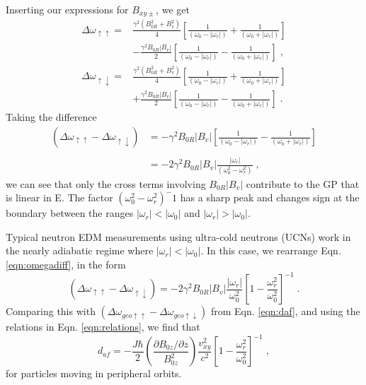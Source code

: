 %
Inserting our expressions for $B_{xy\pm}$, we get
%
\begin{equation}
\begin{split}
\Delta \omega_{\uparrow\uparrow} = & \frac{\gamma^2 (B_{0R}^2 + B_{v}^2)}{4} \left[ 
\frac{1}{(\omega_0 - |\omega_r|)} + \frac{1}{(\omega_0 + |\omega_r|)} \right] \\ & - \frac{\gamma^2 B_{0R} |B_v|}{2} \left[ 
\frac{1}{(\omega_0 - |\omega_r|)} - \frac{1}{(\omega_0 + |\omega_r|)} \right] \; ,
\end{split}
\end{equation}
%
\begin{equation}
\begin{split}
\Delta \omega_{\uparrow\downarrow} = & \frac{\gamma^2 (B_{0R}^2 + B_{v}^2)}{4} \left[ 
\frac{1}{(\omega_0 - |\omega_r|)} + \frac{1}{(\omega_0 + |\omega_r|)} \right] \\ & + \frac{\gamma^2 B_{0R} |B_v|}{2} \left[ 
\frac{1}{(\omega_0 - |\omega_r|)} - \frac{1}{(\omega_0 + |\omega_r|)} \right] \; .
\end{split}
\end{equation}
%
Taking the difference
%
\begin{equation}
\label{eqn:omegadiff}
\begin{split}
(\Delta \omega_{\uparrow\uparrow} - \Delta \omega_{\uparrow\downarrow}) & =   -\gamma^2 B_{0R} |B_{v}| \left[ \frac{1}{(\omega_0 - |\omega_r|)} - \frac{1}{(\omega_0 + |\omega_r|)} \right]
\\ \\ & = -2\gamma^2 B_{0R} |B_{v}|\frac{|\omega_r|}{(\omega_0^2 - \omega_r^2)}\; ,
\end{split}
\end{equation}
%
we can see that only the cross terms involving $B_{0R}|B_v|$
contribute to the GP that is linear in E.  The factor
$(\omega_0^2 - \omega_r^2)^-1$ has a sharp peak and changes sign at
the boundary between the ranges $|\omega_r| < |\omega_0|$ and
$|\omega_r| > |\omega_0|$.

Typical neutron EDM measurements using ultra-cold neutrons (UCNs) work
in the nearly adiabatic regime where $|\omega_r| < |\omega_0|$.  In
this case, we rearrange Eqn. \ref{eqn:omegadiff}, in the form
%
\begin{equation}
(\Delta \omega_{\uparrow\uparrow} - \Delta \omega_{\uparrow\downarrow}) = -2\gamma^2 B_{0R} |B_{v}| \frac{|\omega_r|}{\omega_0^2} \left[1-\frac{\omega_r^2}{\omega_0^2}\right]^{-1} \;.
\end{equation}
%
Comparing this with
$(\Delta \omega_{geo\uparrow\uparrow} - \Delta
\omega_{geo\uparrow\downarrow})$ from Eqn. \ref{eqn:daf}, and using
the relations in Eqn. \ref{eqn:relations}, we find that
%
\begin{equation}
d_{af} = -\frac{J \hbar}{2} \left( \frac{\partial B_{0z} / \partial z}{B_{0z}^2} \right) \frac{v_{xy}^2}{c^2} \left[1-\frac{\omega_r^2}{\omega_0^2}\right]^{-1} \; ,
\end{equation}
%
for particles moving in peripheral orbits.
